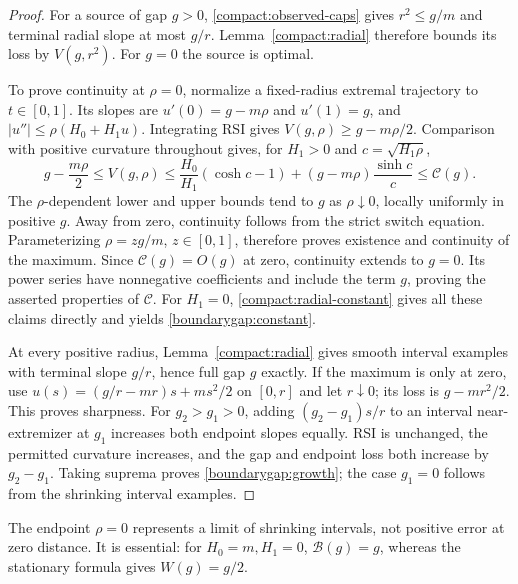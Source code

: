 \begin{proof}\label{boundarygap:proof}
For a source of gap $g>0$, \eqref{compact:observed-caps} gives
$r^2\le g/m$ and terminal radial slope at most $g/r$.
Lemma~\ref{compact:radial} therefore bounds its loss by $V(g,r^2)$.
For $g=0$ the source is optimal.

To prove continuity at $\rho=0$, normalize a fixed-radius extremal
trajectory to $t\in[0,1]$. Its slopes are $u'(0)=g-m\rho$ and
$u'(1)=g$, and $|u''|\le\rho(H_0+H_1u)$. Integrating RSI gives
$V(g,\rho)\ge g-m\rho/2$. Comparison with positive curvature throughout
gives, for $H_1>0$ and $c=\sqrt{H_1\rho}$,
\begin{equation}\label{compact:radial-upper}
 g-\frac{m\rho}{2}\le V(g,\rho)
 \le\frac{H_0}{H_1}(\cosh c-1)
       +(g-m\rho)\frac{\sinh c}{c}\le\mathcal C(g).
\end{equation}
The $\rho$-dependent lower and upper bounds tend to $g$ as $\rho\downarrow0$, locally
uniformly in positive $g$. Away from zero, continuity follows from
the strict switch equation. Parameterizing $\rho=zg/m$, $z\in[0,1]$,
therefore proves existence and continuity of the maximum.
Since $\mathcal C(g)=O(g)$ at zero, continuity extends to $g=0$.
Its power series have nonnegative coefficients and include the term
$g$, proving the asserted properties of $\mathcal C$.
For $H_1=0$, \eqref{compact:radial-constant} gives all these claims
directly and yields \eqref{boundarygap:constant}.

At every positive radius, Lemma~\ref{compact:radial} gives smooth
interval examples with terminal slope $g/r$, hence full gap $g$ exactly.
If the maximum is only at zero, use
$u(s)=(g/r-mr)s+ms^2/2$ on $[0,r]$ and let $r\downarrow0$;
its loss is $g-mr^2/2$. This proves sharpness.
For $g_2>g_1>0$, adding $(g_2-g_1)s/r$ to an interval near-extremizer
at $g_1$ increases both endpoint slopes equally. RSI is unchanged,
the permitted curvature increases, and the gap and endpoint loss both
increase by $g_2-g_1$. Taking suprema proves
\eqref{boundarygap:growth}; the case $g_1=0$ follows from the shrinking
interval examples.
\end{proof}

The endpoint $\rho=0$ represents a limit of shrinking intervals, not
positive error at zero distance. It is essential: for $H_0=m,H_1=0$,
$\mathcal B(g)=g$, whereas the stationary formula gives $W(g)=g/2$.

